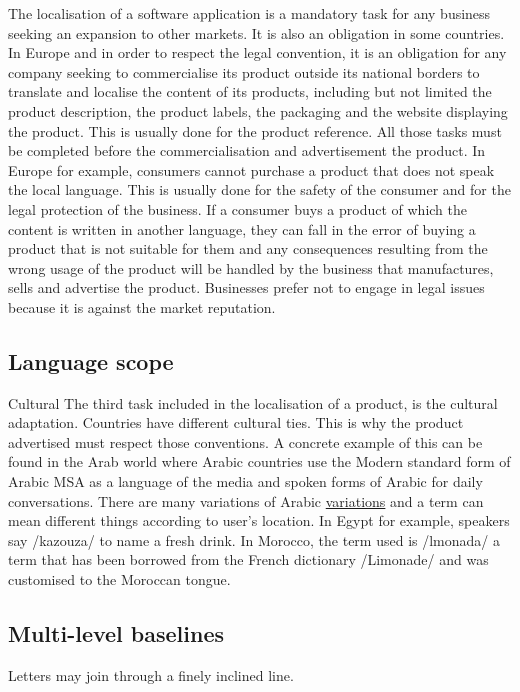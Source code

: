 \documentclass[
	a4paper, %
	10pt, %
	unnumberedsections, %
	twoside, %
]{LTJournalArticle}
\begin{document}
The localisation of a software application is a mandatory task for any business seeking an expansion to other markets. It is also an obligation in some countries. In Europe and in order to respect the legal convention, it is an obligation for any company seeking to commercialise its product outside its national borders to translate and localise the content of its products, including but not limited the product description, the product labels, the packaging and the website displaying the product. This is usually done for the product reference. All those tasks must be completed before the commercialisation and advertisement the product. In Europe for example, consumers cannot purchase a product that does not speak the local language. This is usually done for the safety of the consumer and for the legal protection of the business. If a consumer buys a product of which the content is written in another language, they can fall in the error of buying a product that is not suitable for them and any consequences resulting from the wrong usage of the product will be handled by the business that manufactures, sells and advertise the product. Businesses prefer not to engage in legal issues because it is against the market reputation.

\subsection {Language scope}

Cultural The third task included in the localisation of a product, is the cultural adaptation. Countries have different cultural ties. This is why the product advertised must respect those conventions. A concrete example of this can be found in the Arab world where Arabic countries use the Modern standard form of Arabic MSA as a language of the media and spoken forms of Arabic for daily conversations. There are many variations of Arabic  \href{https://en.wikipedia.org/wiki/Varieties_of_Arabic}{variations} and a term can mean different things according to user's location. In Egypt for example, speakers say /kazouza/ to name a fresh drink. In Morocco, the term used is /lmonada/ a term that has been borrowed from the French dictionary /Limonade/ and was customised to the Moroccan tongue.

\subsection {Multi-level baselines}

Letters may join through a finely inclined line.
\end{document}
